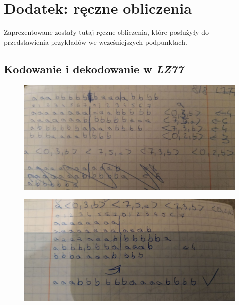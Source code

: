 \documentclass{article}
\begin{document}
\section{Dodatek: ręczne obliczenia}
Zaprezentowane zostały tutaj ręczne obliczenia, które posłużyły do przedstawienia przykładów we wcześniejszych podpunktach.
\subsection{Kodowanie i dekodowanie w \textit{LZ77}}
\begin{figure}[h!]
\centering
\includegraphics[width=450px]{img/obl_lz77_0.JPG}
\end{figure}

\begin{figure}[h!]
\centering
\includegraphics[width=450px]{img/obl_lz77_1.JPG}
\end{figure}

\newpage
\end{document}
